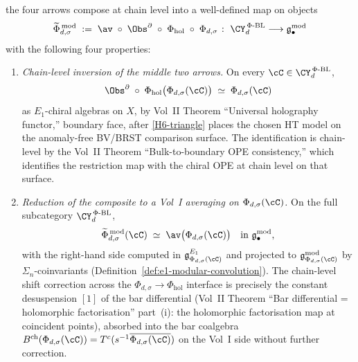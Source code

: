 \begin{theorem}
\[\]
the four arrows compose at chain level into a well-defined map on
objects
\begin{equation}\label{eq:triangle-composite-objects}
 \widetilde\Phi_{d,\sigma}^{\,\mathrm{mod}}
 \;:=\;
 \av \;\circ\; \Obs^\partial \;\circ\; \Phi_{\mathrm{hol}} \;\circ\; \Phi_{d,\sigma}
 \;\colon\;
 \CY_d^{\,\Phi\text{-BL}}
 \longrightarrow
 \mathfrak{g}^{\mathrm{mod}}_\bullet
\end{equation}
with the following four properties:
\begin{enumerate}[label=\textup{(\roman*)}]
\item \emph{Chain-level inversion of the middle two arrows.} On
 every $\cC \in \CY_d^{\,\Phi\text{-BL}}$,
 \begin{equation}\label{eq:triangle-middle-inversion}
 \Obs^\partial \;\circ\; \Phi_{\mathrm{hol}} \bigl(\Phi_{d,\sigma}(\cC)\bigr)
 \;\simeq\; \Phi_{d,\sigma}(\cC)
 \end{equation}
 as $E_1$-chiral algebras on $X$, by Vol~II Theorem ``Universal
 holography functor,'' boundary face, after
 \textup{\ref{H6-triangle}} places the chosen HT model on the
 anomaly-free BV/BRST comparison surface. The identification is
 chain-level by
 the Vol~II Theorem ``Bulk-to-boundary OPE consistency,'' which
 identifies the restriction map with the chiral OPE at chain level on
 that surface.
\item \emph{Reduction of the composite to a Vol~I averaging on
 $\Phi_{d,\sigma}(\cC)$.} On the full subcategory $\CY_d^{\,\Phi\text{-BL}}$,
 \begin{equation}\label{eq:triangle-reduction}
 \widetilde\Phi_{d,\sigma}^{\,\mathrm{mod}}(\cC)
 \;\simeq\;
 \av\bigl(\Phi_{d,\sigma}(\cC)\bigr)
 \quad\text{in } \mathfrak{g}^{\mathrm{mod}}_\bullet,
 \end{equation}
 with the right-hand side computed in
 $\mathfrak{g}^{E_1}_{\Phi_{d,\sigma}(\cC)}$ and projected to
 $\mathfrak{g}^{\mathrm{mod}}_{\Phi_{d,\sigma}(\cC)}$ by
 $\Sigma_n$-coinvariants
 \textup{(}Definition~\textup{\ref{def:e1-modular-convolution}}\textup{).}
 The chain-level shift correction across the
 $\Phi_{d,\sigma} \to \Phi_{\mathrm{hol}}$ interface is precisely the constant
 desuspension $[1]$ of the bar differential
 \textup{(}Vol~II Theorem ``Bar differential = holomorphic
 factorisation'' part~(i): the holomorphic factorisation map at
 coincident points\textup{)}, absorbed into the bar coalgebra
 $B^{\mathrm{ch}}(\Phi_{d,\sigma}(\cC)) = T^c(s^{-1}\overline{\Phi_{d,\sigma}(\cC)})$
 on the Vol~I side without further correction.

\end{enumerate}
\end{theorem}
